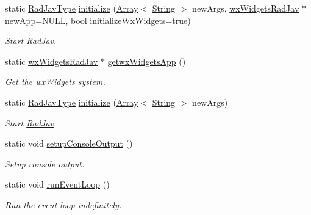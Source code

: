 \begin{DoxyCompactItemize}
\item 
static \mbox{\hyperlink{namespace_rad_j_a_v_a74e0b9a4c586a0346af4029e5a7e3d30}{Rad\+Jav\+Type}} \mbox{\hyperlink{class_rad_j_a_v_1_1_rad_jav_a04f3d51b1f677d8a832696a7f5b4bc6e}{initialize}} (\mbox{\hyperlink{class_rad_j_a_v_1_1_array}{Array}}$<$ \mbox{\hyperlink{class_rad_j_a_v_1_1_string}{String}} $>$ new\+Args, \mbox{\hyperlink{class_rad_j_a_v_1_1wx_widgets_rad_jav}{wx\+Widgets\+Rad\+Jav}} $\ast$new\+App=N\+U\+LL, bool initialize\+Wx\+Widgets=true)
\begin{DoxyCompactList}\small\item\em Start \mbox{\hyperlink{class_rad_j_a_v_1_1_rad_jav}{Rad\+Jav}}. \end{DoxyCompactList}\item 
static \mbox{\hyperlink{class_rad_j_a_v_1_1wx_widgets_rad_jav}{wx\+Widgets\+Rad\+Jav}} $\ast$ \mbox{\hyperlink{class_rad_j_a_v_1_1_rad_jav_a524921ac787c2c33cd9d76e6f89bac67}{getwx\+Widgets\+App}} ()
\begin{DoxyCompactList}\small\item\em Get the wx\+Widgets system. \end{DoxyCompactList}\item 
static \mbox{\hyperlink{namespace_rad_j_a_v_a74e0b9a4c586a0346af4029e5a7e3d30}{Rad\+Jav\+Type}} \mbox{\hyperlink{class_rad_j_a_v_1_1_rad_jav_a0403392e138a7a7ed4b486fc881a1322}{initialize}} (\mbox{\hyperlink{class_rad_j_a_v_1_1_array}{Array}}$<$ \mbox{\hyperlink{class_rad_j_a_v_1_1_string}{String}} $>$ new\+Args)
\begin{DoxyCompactList}\small\item\em Start \mbox{\hyperlink{class_rad_j_a_v_1_1_rad_jav}{Rad\+Jav}}. \end{DoxyCompactList}\item 
static void \mbox{\hyperlink{class_rad_j_a_v_1_1_rad_jav_af1824373c48cbb29dcf9e6047ec97d78}{setup\+Console\+Output}} ()
\begin{DoxyCompactList}\small\item\em Setup console output. \end{DoxyCompactList}\item 
static void \mbox{\hyperlink{class_rad_j_a_v_1_1_rad_jav_aee26bfc80b2d79f1fd8f1be00078dae9}{run\+Event\+Loop}} ()
\begin{DoxyCompactList}\small\item\em Run the event loop indefinitely. \end{DoxyCompactList}\item 

\end{DoxyCompactItemize}
